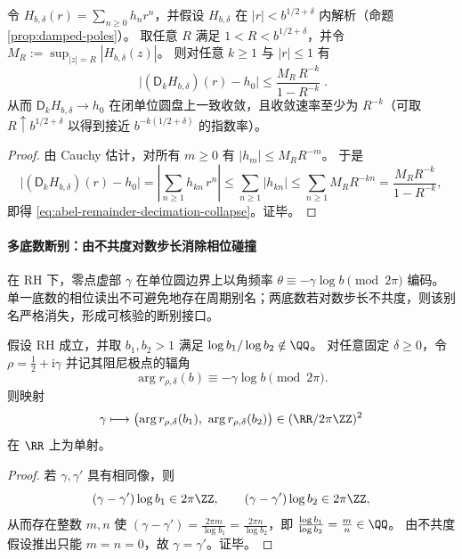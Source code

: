 \begin{proposition}[解析余项在抽取下的指数塌缩]\label{prop:abel-analytic-remainder-decimation-collapse}
令 \(H_{b,\delta}(r)=\sum_{n\ge 0}h_n r^n\)，并假设 \(H_{b,\delta}\) 在 \(|r|<b^{1/2+\delta}\) 内解析（命题 \ref{prop:damped-poles}）。
取任意 \(R\) 满足 \(1<R<b^{1/2+\delta}\)，并令
\(
M_R:=\sup_{|z|=R}|H_{b,\delta}(z)|
\)。
则对任意 \(k\ge 1\) 与 \(|r|\le 1\) 有
\begin{equation}\label{eq:abel-remainder-decimation-collapse}
\boxed{\;
\bigl|(\mathsf D_k H_{b,\delta})(r)-h_0\bigr|
\le
\frac{M_R\,R^{-k}}{1-R^{-k}}\; }.
\end{equation}
从而 \(\mathsf D_k H_{b,\delta}\to h_0\) 在闭单位圆盘上一致收敛，且收敛速率至少为 \(R^{-k}\)（可取 \(R\uparrow b^{1/2+\delta}\) 以得到接近 \(b^{-k(1/2+\delta)}\) 的指数率）。
\end{proposition}
\begin{proof}
由 Cauchy 估计，对所有 \(m\ge 0\) 有 \(|h_m|\le M_R R^{-m}\)。
于是
\[
\bigl|(\mathsf D_k H_{b,\delta})(r)-h_0\bigr|
=\left|\sum_{n\ge 1}h_{kn}\,r^n\right|
\le \sum_{n\ge 1}|h_{kn}|
\le \sum_{n\ge 1}M_R R^{-kn}
=\frac{M_R R^{-k}}{1-R^{-k}},
\]
即得 \eqref{eq:abel-remainder-decimation-collapse}。证毕。
\end{proof}

\paragraph{多底数断别：由不共度对数步长消除相位碰撞}
在 RH 下，零点虚部 \(\gamma\) 在单位圆边界上以角频率
\(
\theta\equiv -\gamma\log b\pmod{2\pi}
\)
编码。
单一底数的相位读出不可避免地存在周期别名；两底数若对数步长不共度，则该别名严格消失，形成可核验的断别接口。

\begin{proposition}\label{prop:abel-two-base-dealiasing-injectivity}
假设 RH 成立，并取 \(b_1,b_2>1\) 满足 \(\log b_1/\log b_2\notin\QQ\)。
对任意固定 \(\delta\ge 0\)，令 \(\rho=\tfrac12+\mathrm{i}\gamma\) 并记其阻尼极点的辐角
\[
\arg r_{\rho,\delta}(b)\equiv -\gamma\log b\pmod{2\pi}.
\]
则映射
\[
\gamma\longmapsto \bigl(\arg r_{\rho,\delta}(b_1),\ \arg r_{\rho,\delta}(b_2)\bigr)\in(\RR/2\pi\ZZ)^2
\]
在 \(\RR\) 上为单射。
\end{proposition}
\begin{proof}
若 \(\gamma,\gamma'\) 具有相同像，则
\[
(\gamma-\gamma')\log b_1\in 2\pi\ZZ,
\qquad
(\gamma-\gamma')\log b_2\in 2\pi\ZZ,
\]
从而存在整数 \(m,n\) 使 \((\gamma-\gamma')=\frac{2\pi m}{\log b_1}=\frac{2\pi n}{\log b_2}\)，即
\(
\frac{\log b_1}{\log b_2}=\frac{m}{n}\in\QQ
\)。
由不共度假设推出只能 \(m=n=0\)，故 \(\gamma=\gamma'\)。证毕。
\end{proof}

